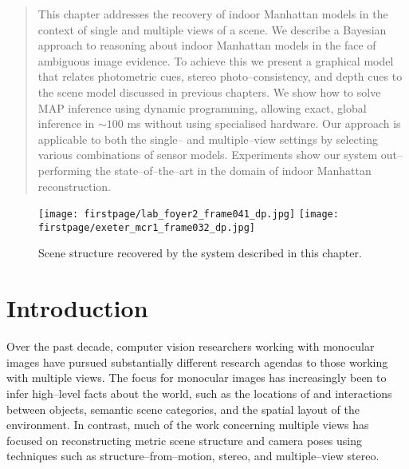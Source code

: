 \begin{quote}
  This chapter addresses the recovery of indoor Manhattan models in
  the context of single and multiple views of a scene. We describe a
  Bayesian approach to reasoning about indoor Manhattan models in the
  face of ambiguous image evidence. To achieve this we present a
  graphical model that relates photometric cues, stereo
  photo--consistency, and depth cues to the scene model discussed in
  previous chapters. We show how to solve MAP inference using dynamic
  programming, allowing exact, global inference in $\sim$$100$ ms
  without using specialised hardware. Our approach is applicable to
  both the single-- and multiple--view settings by selecting various
  combinations of sensor models. Experiments show our system
  out--performing the state--of--the--art in the domain of indoor
  Manhattan reconstruction.\footnotemark
\end{quote}


\begin{figure}[tb]%
  \centering
    \texttt{[image: firstpage/lab\_foyer2\_frame041\_dp.jpg]}
    \texttt{[image: firstpage/exeter\_mcr1\_frame032\_dp.jpg]}
    \caption{Scene structure recovered by the system described in
      this chapter.}
  \label{fig:recovered-egs}
\end{figure}

\section{Introduction}
Over the past decade, computer vision researchers working with
monocular images have pursued substantially different research
agendas to those working with multiple views. The focus for
monocular images has increasingly been to infer high--level facts
about the world, such as the locations of and interactions between
objects, semantic scene categories, and the spatial layout of the
environment. In contrast, much of the work concerning multiple views
has focused on reconstructing metric scene structure and camera poses
using techniques such as structure--from--motion, stereo, and
multiple--view stereo.


